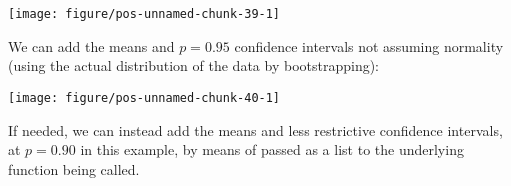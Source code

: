 \documentclass[paper=a4,10pt,div=17,headsepline,BCOR=12mm,twoside,open=right]{scrbook}\usepackage{knitr}
\begin{document}
\begin{knitrout}\footnotesize
{}\color{fgcolor}\begin{kframe}
\begin{alltt}
 \hlopt{+} \hlstd{(} \hlstd{=} \hlstd{,}
                    \hlstd{=}\hlstd{,} \hlstd{=}\hlstd{,} \hlstd{=}\hlstd{)}
\end{alltt}
\end{kframe}

{\centering \texttt{[image: figure/pos-unnamed-chunk-39-1]} 

}



\end{knitrout}

We can add the means and $p = 0.95$ confidence intervals not assuming normality (using the actual distribution of the data by bootstrapping):

\begin{knitrout}\footnotesize
{}\color{fgcolor}\begin{kframe}
\begin{alltt}
 \hlopt{+} \hlstd{(} \hlstd{=} \hlstd{,}
                    \hlstd{=}\hlstd{,} \hlstd{=}\hlstd{,} \hlstd{=}\hlstd{)}
\end{alltt}
\end{kframe}

{\centering \texttt{[image: figure/pos-unnamed-chunk-40-1]} 

}



\end{knitrout}

If needed, we can instead add the means and less restrictive confidence intervals, at $p = 0.90$ in this example, by means of  passed as a list to the underlying function being called.
\end{document}
